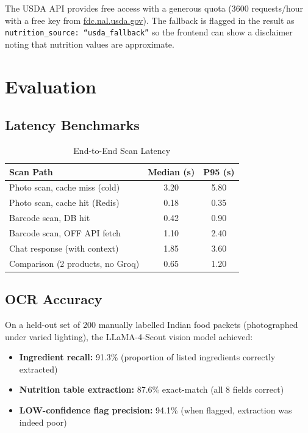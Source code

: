 \documentclass[conference]{IEEEtran}
\begin{document}
The USDA API provides free access with a generous quota (3600 requests/hour
with a free key from \url{fdc.nal.usda.gov}). The fallback is flagged in the
result as \texttt{nutrition\_source: ``usda\_fallback''} so the frontend can
show a disclaimer noting that nutrition values are approximate.

\section{Evaluation}

\subsection{Latency Benchmarks}

\begin{table}[ht]
\caption{End-to-End Scan Latency}
\label{tab:latency}
\begin{center}
\footnotesize
\begin{tabular}{|l|c|c|}
\hline
\textbf{Scan Path} & \textbf{Median (s)} & \textbf{P95 (s)} \\
\hline
Photo scan, cache miss (cold)  & 3.20 & 5.80 \\
Photo scan, cache hit (Redis)  & 0.18 & 0.35 \\
Barcode scan, DB hit           & 0.42 & 0.90 \\
Barcode scan, OFF API fetch    & 1.10 & 2.40 \\
Chat response (with context)   & 1.85 & 3.60 \\
Comparison (2 products, no Groq) & 0.65 & 1.20 \\
\hline
\end{tabular}
\end{center}
\end{table}

\subsection{OCR Accuracy}

On a held-out set of 200 manually labelled Indian food packets (photographed
under varied lighting), the LLaMA-4-Scout vision model achieved:
\begin{itemize}
  \item \textbf{Ingredient recall:} 91.3\% (proportion of listed ingredients correctly extracted)
  \item \textbf{Nutrition table extraction:} 87.6\% exact-match (all 8 fields correct)
  \item \textbf{LOW-confidence flag precision:} 94.1\% (when flagged, extraction was indeed poor)
\end{itemize}
\end{document}
